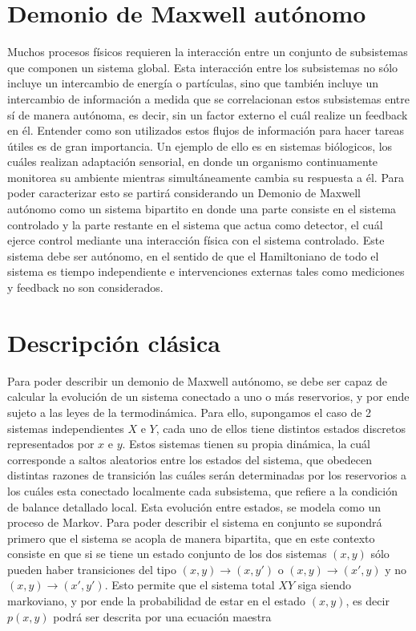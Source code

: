 \section{Demonio de Maxwell autónomo}
Muchos procesos físicos requieren la interacción entre un conjunto de subsistemas que componen un sistema global. Esta interacción entre los subsistemas no sólo incluye un intercambio de energía o partículas, sino que también incluye un intercambio de información a medida que se correlacionan estos subsistemas entre sí de manera autónoma, es decir, sin un factor externo el cuál realize un feedback en él. Entender como son utilizados estos flujos de información para hacer tareas útiles es de gran importancia. Un ejemplo de ello es en sistemas biólogicos, los cuáles realizan adaptación sensorial, en donde un organismo continuamente monitorea su ambiente mientras simultáneamente cambia su respuesta a él\cite{lan2012energy}. Para poder caracterizar esto se partirá considerando un Demonio de Maxwell autónomo como un sistema bipartito en donde una parte consiste en el sistema controlado y la parte restante en el sistema que actua como detector, el cuál ejerce control mediante una interacción física con el sistema controlado. Este sistema debe ser autónomo, en el sentido de que el Hamiltoniano de todo el sistema es tiempo independiente e intervenciones externas tales como mediciones y feedback no son considerados.

\section{Descripción clásica}
Para poder describir un demonio de Maxwell autónomo, se debe ser capaz de calcular la evolución de un sistema conectado a uno o más reservorios, y por ende sujeto a las leyes de la termodinámica. Para ello, supongamos el caso de 2 sistemas independientes $X$ e $Y$, cada uno de ellos tiene distintos estados discretos representados por $x$ e $y$. Estos sistemas tienen su propia dinámica, la cuál corresponde a saltos aleatorios entre los estados del sistema, que obedecen distintas razones de transición las cuáles serán determinadas por los reservorios a los cuáles esta conectado localmente cada subsistema, que refiere a la condición de balance detallado local\cite{van2015ensemble}. Esta evolución entre estados, se modela como un proceso de Markov\cite{van1992stochastic}. Para poder describir el sistema en conjunto se supondrá primero que el sistema se acopla de manera bipartita, que en este contexto consiste en que si se tiene un estado conjunto de los dos sistemas $(x,y)$ sólo pueden haber transiciones del tipo $(x,y) \to (x,y')$ o $(x,y) \to (x',y)$ y no $(x,y) \to (x',y')$. Esto permite que el sistema total $XY$ siga siendo markoviano, y por ende la probabilidad de estar en el estado $(x,y)$, es decir $p(x,y)$ podrá ser descrita por una ecuación maestra

